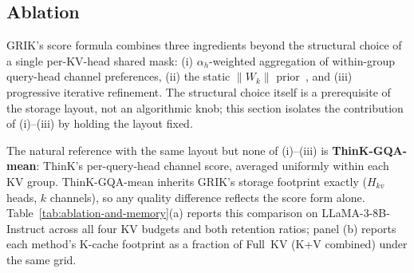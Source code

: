 \documentclass{article}
\begin{document}
 

\subsection{Ablation}
\label{sec:ablation}
 
GRIK's score formula combines three ingredients beyond the structural choice of a single per-KV-head shared mask: (i) $\alpha_h$-weighted aggregation of within-group query-head channel preferences, (ii) the static $\|W_k\|$ prior~\citep{wanda}, and (iii) progressive iterative refinement. The structural choice itself is a prerequisite of the storage layout, not an algorithmic knob; this section isolates the contribution of (i)--(iii) by holding the layout fixed.
 
The natural reference with the same layout but none of (i)--(iii) is \textbf{ThinK-GQA-mean}: ThinK's per-query-head channel score, averaged uniformly within each KV group. ThinK-GQA-mean inherits GRIK's storage footprint exactly ($H_{kv}$ heads, $k$ channels), so any quality difference reflects the score form alone. Table~\ref{tab:ablation-and-memory}(a) reports this comparison on LLaMA-3-8B-Instruct across all four KV budgets and both retention ratios; panel (b) reports each method's K-cache footprint as a fraction of Full~KV (K+V combined) under the same grid.
 
\end{document}
